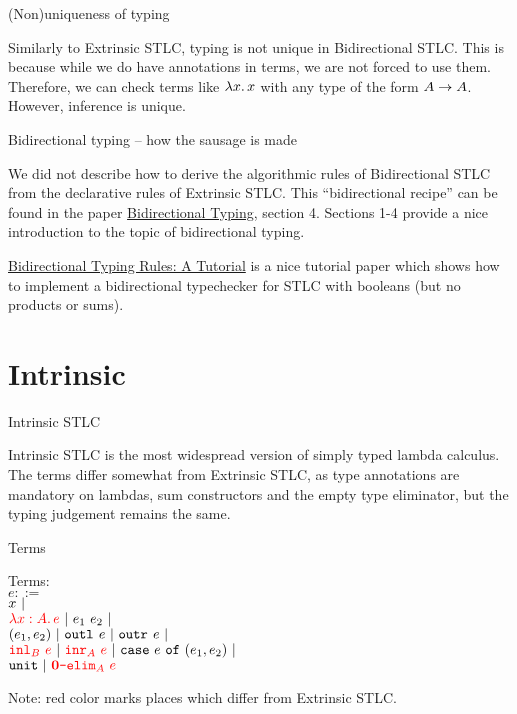 \documentclass{beamer}
\begin{document}
\begin{frame}{(Non)uniqueness of typing}

Similarly to Extrinsic STLC, typing is not unique in Bidirectional STLC. This is because while we do have annotations in terms, we are not forced to use them. Therefore, we can check terms like $\fun{x}{x}$ with any type of the form $A \to A$. However, inference is unique.

\end{frame}

\begin{frame}{Bidirectional typing -- how the sausage is made}

We did not describe how to derive the algorithmic rules of Bidirectional STLC from the declarative rules of Extrinsic STLC. This ``bidirectional recipe'' can be found in the paper \href{https://arxiv.org/pdf/1908.05839}{Bidirectional Typing}, section 4. Sections 1-4 provide a nice introduction to the topic of bidirectional typing.

\vspace{2em}

\href{http://davidchristiansen.dk/tutorials/bidirectional.pdf}{Bidirectional Typing Rules: A Tutorial} is a nice tutorial paper which shows how to implement a bidirectional typechecker for STLC with booleans (but no products or sums).

\end{frame}

\section{Intrinsic}

\begin{frame}{Intrinsic STLC}

Intrinsic STLC is the most widespread version of simply typed lambda calculus. The terms differ somewhat from Extrinsic STLC, as type annotations are mandatory on lambdas, sum constructors and the empty type eliminator, but the typing judgement remains the same.

\end{frame}

\begin{frame}{Terms}

Terms: \\
$e ::=$ \\
\qquad $x \ |\ $ \\
\qquad $\termdiff{\fun{x}[A]{e}} \pipe \app{e_1}{e_2} \pipe$ \\
\qquad $(e_1, e_2) \ |\  \texttt{outl}_{}\ e \ |\  \texttt{outr}_{}\ e \ |\ $ \\
\qquad $\termdiff{\inl[B]{e}} \pipe \termdiff{\inr[A]{e}} \pipe \case{e}{e_1}{e_2} \pipe$ \\
\qquad $\unit \pipe \termdiff{\emptyelim[A]{e}}$

\vspace{2em}

Note: red color marks places which differ from Extrinsic STLC.

\end{frame}
\end{document}

